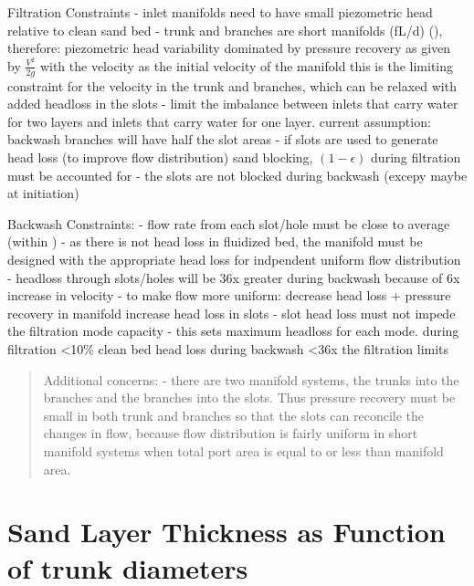 \documentclass[letterpaper,10pt,english]{sphinxmanual}
\begin{document}
Filtration Constraints
- inlet manifolds need to have small piezometric head relative to clean sand bed
- trunk and branches are short manifolds (fL/d) (), therefore: piezometric head variability dominated by pressure recovery as given by \(\frac{V^2}{2g}\) with the velocity as the initial velocity of the manifold
\textendash{} this is the limiting constraint for the velocity in the trunk and branches, which can be relaxed with added headloss in the slots
- limit the imbalance between inlets that carry water for two layers and inlets that carry water for one layer.
\textendash{} 
\textendash{} current assumption: backwash branches will have half the slot areas
- if slots are used to generate head loss (to improve flow distribution) sand blocking, \((1-\epsilon)\) during filtration must be accounted for
- the slots are not blocked during backwash (excepy maybe at initiation)

Backwash Constraints:
- flow rate from each slot/hole must be close to average (within )
- as there is not head loss in fluidized bed, the manifold must be designed with the appropriate head loss for indpendent uniform flow distribution
- headloss through slots/holes will be 36x greater during backwash because of 6x increase in velocity
- to make flow more uniform:
\textendash{} decrease head loss + pressure recovery in manifold
\textendash{} increase head loss in slots
- slot head loss must not impede the filtration mode capacity
- this sets maximum headloss for each mode.
\textendash{} during filtration \textless{}10\% clean bed head loss
\textendash{} during backwash \textless{}36x the filtration limits
\begin{quote}

Additional concerns:
- there are two manifold systems, the trunks into the branches and the branches into the slots. Thus pressure recovery must be small in both trunk and branches so that the slots can reconcile the changes in flow, because flow distribution is fairly uniform in short manifold systems when total port area is equal to or less than manifold area.
\end{quote}


\section{Sand Layer Thickness as Function of trunk diameters}
\label{\detokenize{Filtration/Filtration_Design:sand-layer-thickness-as-function-of-trunk-diameters}}
\end{document}
